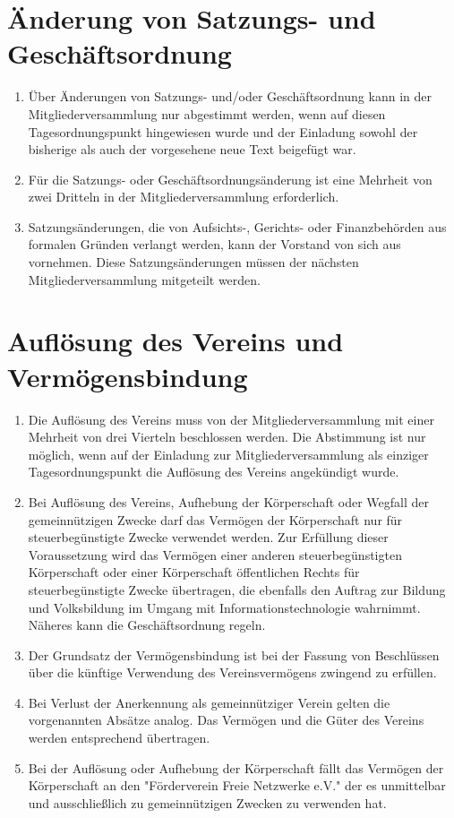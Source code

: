 \documentclass[a4paper,DIV10,12pt,headsepline]{scrartcl}
\begin{document}
\section{Änderung von Satzungs- und Geschäftsordnung}
\begin{enumerate}
	\item Über Änderungen von Satzungs- und/oder Geschäftsordnung kann in der Mitgliederversammlung nur abgestimmt werden, wenn auf diesen Tagesordnungspunkt hingewiesen wurde und der Einladung sowohl der bisherige als auch der vorgesehene neue Text beigefügt war.
	\item Für die Satzungs- oder Geschäftsordnungsänderung ist eine Mehrheit von zwei Dritteln in der Mitgliederversammlung erforderlich.
	\item Satzungsänderungen, die von Aufsichts-, Gerichts- oder Finanzbehörden aus formalen Gründen verlangt werden, kann der Vorstand von sich aus vornehmen. Diese Satzungsänderungen müssen der nächsten Mitgliederversammlung mitgeteilt werden.
\end{enumerate}

\section{Auflösung des Vereins und Vermögensbindung}
\begin{enumerate}
	\item Die Auflösung des Vereins muss von der Mitgliederversammlung mit einer Mehrheit von drei Vierteln beschlossen werden. Die Abstimmung ist nur möglich, wenn auf der Einladung zur Mitgliederversammlung als einziger Tagesordnungspunkt die Auflösung des Vereins angekündigt wurde.
	\item Bei Auflösung des Vereins, Aufhebung der Körperschaft oder Wegfall der gemeinnützigen Zwecke darf das Vermögen der Körperschaft nur für steuerbegünstigte Zwecke verwendet werden. Zur Erfüllung dieser Voraussetzung wird das Vermögen einer anderen steuerbegünstigten Körperschaft oder einer Körperschaft öffentlichen Rechts für steuerbegünstigte Zwecke übertragen, die ebenfalls den Auftrag zur Bildung und Volksbildung im Umgang mit Informationstechnologie wahrnimmt. Näheres kann die Geschäftsordnung regeln.
	\item Der Grundsatz der Vermögensbindung ist bei der Fassung von Beschlüssen über die künftige Verwendung des Vereinsvermögens zwingend zu erfüllen.
	\item Bei Verlust der Anerkennung als gemeinnütziger Verein gelten die vorgenannten Absätze analog. Das Vermögen und die Güter des Vereins werden entsprechend übertragen.
	\item Bei der Auflösung oder Aufhebung der Körperschaft fällt das Vermögen der Körperschaft an den "Förderverein Freie Netzwerke e.V." der es unmittelbar und ausschließlich zu gemeinnützigen Zwecken zu verwenden hat.
\end{enumerate}
\end{document}
